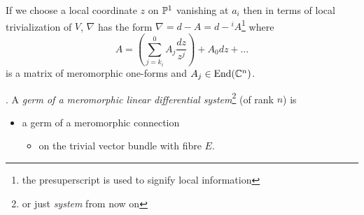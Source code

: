 \begin{paracol}{2}\sloppy
\switchcolumn[0]\noindent
  If we choose a local coordinate $z$ on $\P^1$ vanishing at $a_i$ then in
  terms of local trivialization of $V$, $\nabla$ has the form
  $\nabla=d-A=d-{}^iA$\footnote{the presuperscript is used to signify local
  information} where
  \[
    A=\left(\sum^{0}_{j=k_i}A_j\frac{dz}{z^{j}}\right)+A_0dz+\dots
  \]
  is a matrix of meromorphic one-forms and $A_j\in\End(\C^n)$.
\switchcolumn[1]\noindent
  \begin{defn}
    \cite[Def 1.5]{thboalch}.
    A \emph{germ of a meromorphic linear differential system}\footnote{or just
    \emph{system} from now on} (of rank $n$) is
    \begin{itemize}
      \item a germ of a meromorphic connection
        \begin{itemize}
          \item on the trivial vector bundle with fibre $E$.
        \end{itemize}
    \end{itemize}
  \end{defn}
\end{paracol}
